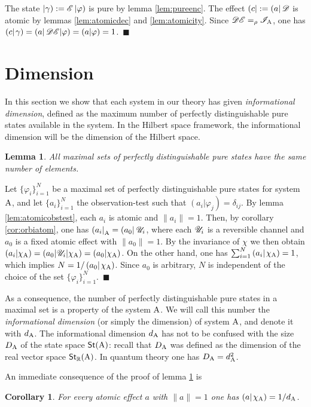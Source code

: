 \documentclass[12pt,aps,pra,showpacs,groupedaddress]{revtex4-1}
\newtheorem{lemma}{Lemma} \newtheorem{proposition}{Proposition}
\newtheorem{corollary}{Corollary} \newtheorem{theorem}{Theorem}
\def\Proof{\medskip\par\noindent{\bf Proof. }}
\def\qed{$\,\blacksquare$\par}
\def\Stset{{\mathsf{St}}}
\def\K#1{\left|#1\right)}  \def\B#1{\left(#1\right|}
\def\SC#1#2{\left(#1\right|\left.\!#2\right)}  \def\Tr{{\rm Tr}}
\def\Reals{{\mathbb R}}
\begin{document}
\Proof The state $\K \gamma:= \tE\K \varphi$ is pure by lemma \ref{lem:pureenc}.  The effect $\B c :
= \B a \tD$ is atomic by lemmas \ref{lem:atomicdec} and \ref{lem:atomicity}. Since
$\mathscr D\mathscr E=_\rho\mathscr I_{\rm A}$, one has $ \SC c \gamma = \B a \tD\tE|\varphi)=(a|\varphi)=1$.  \qed

  



\section{Dimension}\label{sec:dimension}
In this section we show that each system in our theory has given \emph{informational dimension}, defined as the maximum number of perfectly distinguishable pure states available in the system.  In the Hilbert space framework, the informational dimension will be the dimension of the Hilbert space.   
 
  
\begin{lemma}\label{lem:samecard}
All maximal sets of perfectly distinguishable pure states have the same number of elements.
\end{lemma}
 
\Proof Let $\{\varphi_i\}_{i=1}^N$ be a maximal set of perfectly distinguishable pure states for
system ${\rm A}$, and let $\{a_i\}_{i=1}^N$ the observation-test such that $\SC {a_i}{\varphi_j}=
\delta_{ij}$.  By lemma \ref{lem:atomicobstest}, each $a_i$ is atomic and $\|a_i\|=1$.  Then, by
corollary \ref{cor:orbiatom}, one has $\B {a_i}_\rA = \B{a_0} \tU_i$, where each $\mathscr U_i$ is a
reversible channel and $a_0$ is a fixed atomic effect with $\|a_0\|=1$.  By the invariance of $\chi$
we then obtain $(a_i|\chi_{\rm A})=(a_0|\mathscr U_i|\chi_{\rm A})=(a_0|\chi_{\rm A})$. On the other hand, one has
$\sum_{i=1}^N \SC {a_i} {\chi_\rA} =1$, which implies $N = 1/\SC {a_0} {\chi_\rA}$.  Since $a_0$ is
arbitrary, $N$ is independent of the choice of the set $\{\varphi_i\}_{i=1}^N$. \qed

As a consequence, the number of perfectly distinguishable pure states in a maximal set is a property
of the system ${\rm A}$. We will call this number the \emph{informational dimension} (or simply the
dimension) of system ${\rm A}$, and denote it with $d_{\rm A}$. The informational dimension $d_{\rm A}$ has not to be confused with the size $D_{\rm A}$ of the state space $\Stset(\rA)$: recall that $D_{\rm A}$ was defined as the dimension of the real vector space $\Stset_{\Reals} (\rA)$.   In quantum theory one has $D_{\rm A}  = d_{\rm A}^2$.  
   

An immediate consequence of the proof of lemma \ref{lem:samecard} is
 \begin{corollary}\label{cor:uno degli ultimi corollari}
   For every atomic effect $a$ with $\|a\|=1$ one has $\SC a {\chi_\rA}
   = 1/d_\rA$.
 \end{corollary}
\end{document}
